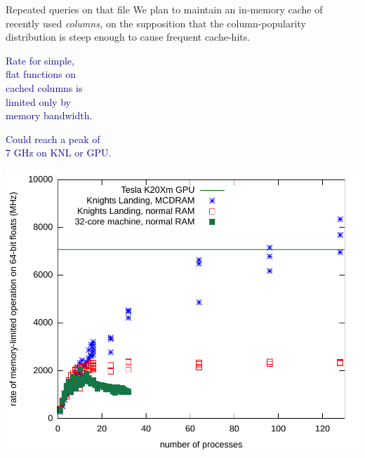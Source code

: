 \documentclass{beamer}
\begin{document}
\begin{frame}{Repeated queries on that file}
\vspace{0.5 cm}
We plan to maintain an in-memory cache of recently used {\it columns,} on the supposition that the column-popularity distribution is steep enough to cause frequent cache-hits.

\vspace{0.4 cm}
\textcolor{darkblue}{Rate for simple, \\ flat functions on \\ cached columns is \\ limited only by \\ memory bandwidth.}

\vspace{0.2 cm}
\textcolor{darkblue}{Could reach a peak of \\ 7 GHz on KNL or GPU.}

\vspace{-7\baselineskip}
\vspace{-0.2 cm}
\hfill \mbox{\includegraphics[width=0.7\linewidth]{cleaner.pdf}\hspace{-0.75 cm}}
\end{frame}
\end{document}

